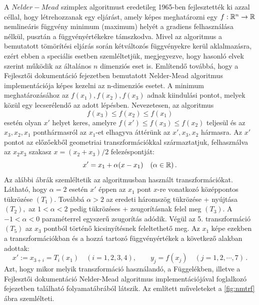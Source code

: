 \documentclass[oneside,titlepage,12pt,a4paper]{report}
\begin{document}
A $Nelder-Mead$ szimplex algoritmust \cite{nelderMead} eredetileg 1965-ben
fejlesztették ki azzal céllal, hogy létrehozzanak egy eljárást, amely
képes meghatározni egy $f : \Bbb R^n \to \Bbb R$ nemlineáris függvény minimum (maximum) helyét a  gradiens felhasználása  nélkül,
 pusztán a függvényértékekre  támszkodva. 
Mivel az algoritmus a bemutatott tömörítési eljárás során kétváltozós függvényekre kerül aklalmazásra, ezért ebben a speciális esetben szemléltetjük, megjegyezve, hogy hasonló 
elvek szerint
 működik az általános $n$ dimenziós eset is. Említendő továbbá, hogy a Fejlesztői dokumentáció fejezetben bemutatott Nelder-Mead algoritmus implementációja képes kezelni az n-dimenziós esetet.  A minimum meghatározásához az $f(x_1), f(x_2), f(x_3)$  adnak kiindulási pontot, melyek közül egy lecserélendő az adott lépésben. Nevezetesen, az algoritmus
\begin{equation*}
f(x_3)\le f(x_2)\le f(x_1)
\end{equation*}
 esetén olyan $x'$ helyet keres, amelyre $f(x')\le  f(x_3)\le f(x_2)$ teljesül és az $x_3, x_2, x_1$ ponthármasról az $x_1$-et elhagyva áttérünk az $x',x_3, x_2$ hármasra. Az $x'$ pontot az előzőekből geometriai transzformációkkal származtatjuk, felhasználva az  $x_2x_3$ szakasz $x=(x_2+x_3)/2$ felezéspontját: 
\begin{equation*}
x'=x_1+\alpha (x-x_1) \quad (\alpha\in\Bbb R)\,.
\end{equation*}
 Az alábbi ábrák szemléltetik az algoritmusban  használt transzformációkat. Látható, hogy $\alpha=2$ esetén $x'$ éppen az $x_1$ pont $x$-re vonatkozó középpontos tükrözése $(T_1).$ Továbbá $\alpha>2$ az eredeti háromszög tükrözése + nyújtása $(T_2),$ az $1<\alpha<2$ pedig tükrözéses + zsugorításnak felel meg $(T_3).$ A $-1<\alpha<0$ paraméterrel egyszerű zsugorítás adódik. Végül az 5. transzformáció $(T_5)$ az $x_3$ pontból történő
 kicsinyítésnek feleltethető meg. Az $x_1$ képe ezekben a transzformációkban és a hozzá tartozó függvényértékek a következő alakban adottak:
\begin{equation*}
x':=x_{3+i}=T_i(x_1)\quad (i=1,2,3,4), \qquad y_j=f(x_j)\quad (j=1,2,\cdots,7)\,.
\end{equation*}
Azt, hogy mikor melyik transzformáció használandó, a Függelékben, illetve a Fejlesztői dokumentáció Nelder-Mead algoritmus implementációjával foglalkozó fejezetben
található  folyamatábrából látszik. Az említett műveleteket a \ref{fig:nmtrf} ábra szemlélteti.
\end{document}
